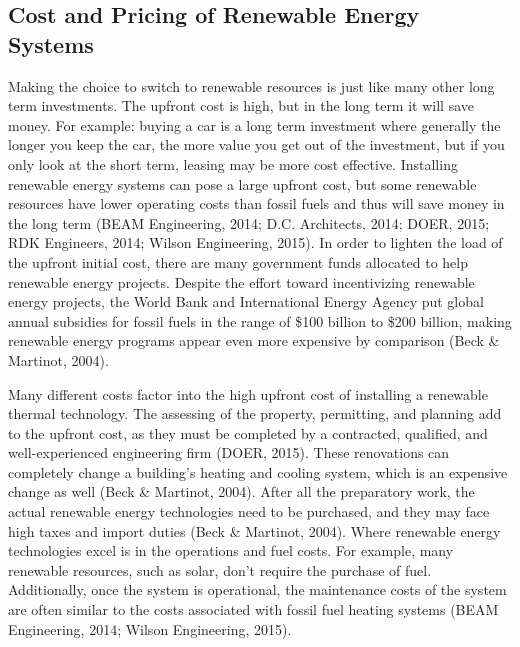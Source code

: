     \subsection{Cost and Pricing of Renewable Energy Systems}
    \par Making the choice to switch to renewable resources is just like many other long term investments. The upfront cost is high, but in the long term it will save money. For example: buying a car is a long term investment where generally the longer you keep the car, the more value you get out of the investment, but if you only look at the short term, leasing may be more cost effective. Installing renewable energy systems can pose a large upfront cost, but some renewable resources have lower operating costs than fossil fuels and thus will save money in the long term (BEAM Engineering, 2014; D.C. Architects, 2014; DOER, 2015; RDK Engineers, 2014; Wilson Engineering, 2015). In order to lighten the load of the upfront initial cost, there are many government funds allocated to help renewable energy projects. Despite the effort toward incentivizing renewable energy projects, the World Bank and International Energy Agency put global annual subsidies for fossil fuels in the range of \$100 billion to \$200 billion, making renewable energy programs appear even more expensive by comparison (Beck \& Martinot, 2004).
    \par Many different costs factor into the high upfront cost of installing a renewable thermal technology. The assessing of the property, permitting, and planning add to the upfront cost, as they must be completed by a contracted, qualified, and well-experienced engineering firm (DOER, 2015). These renovations can completely change a building's heating and cooling system, which is an expensive change as well (Beck \& Martinot, 2004). After all the preparatory work, the actual renewable energy technologies need to be purchased, and they may face high taxes and import duties (Beck \& Martinot, 2004). Where renewable energy technologies excel is in the operations and fuel costs. For example, many renewable resources, such as solar, don't require the purchase of fuel. Additionally, once the system is operational, the maintenance costs of the system are often similar to the costs associated with fossil fuel heating systems (BEAM Engineering, 2014; Wilson Engineering, 2015).

